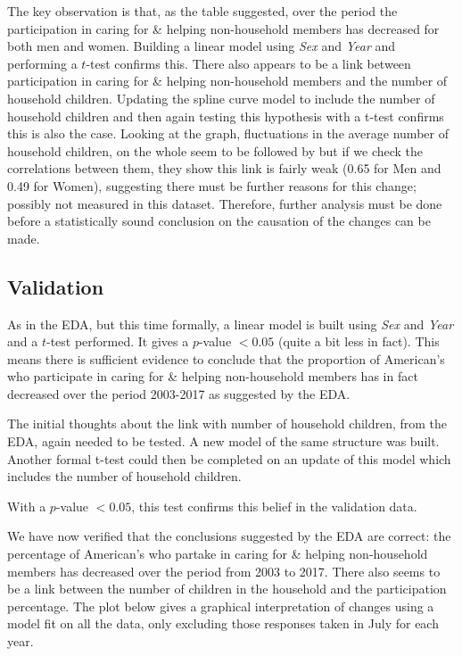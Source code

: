 \documentclass[11pt,]{article}
\begin{document}
The key observation is that, as the table suggested, over the period the
participation in caring for \& helping non-household members has
decreased for both men and women. Building a linear model using
\emph{Sex} and \emph{Year} and performing a \(t\)-test confirms this.
There also appears to be a link between participation in caring for \&
helping non-household members and the number of household children.
Updating the spline curve model to include the number of household
children and then again testing this hypothesis with a t-test confirms
this is also the case. Looking at the graph, fluctuations in the average
number of household children, on the whole seem to be followed by but if
we check the correlations between them, they show this link is fairly
weak (0.65 for Men and 0.49 for Women), suggesting there must be further
reasons for this change; possibly not measured in this dataset.
Therefore, further analysis must be done before a statistically sound
conclusion on the causation of the changes can be made.

\hypertarget{validation}{%
\subsection{Validation}\label{validation}}

As in the EDA, but this time formally, a linear model is built using
\emph{Sex} and \emph{Year} and a \(t\)-test performed. It gives a
\(p\)-value \(< 0.05\) (quite a bit less in fact). This means there is
sufficient evidence to conclude that the proportion of American's who
participate in caring for \& helping non-household members has in fact
decreased over the period 2003-2017 as suggested by the EDA.

The initial thoughts about the link with number of household children,
from the EDA, again needed to be tested. A new model of the same
structure was built. Another formal t-test could then be completed on an
update of this model which includes the number of household children.

With a \(p\)-value \(< 0.05\), this test confirms this belief in the
validation data.

We have now verified that the conclusions suggested by the EDA are
correct: the percentage of American's who partake in caring for \&
helping non-household members has decreased over the period from 2003 to
2017. There also seems to be a link between the number of children in
the household and the participation percentage. The plot below gives a
graphical interpretation of changes using a model fit on all the data,
only excluding those responses taken in July for each year.
\end{document}
